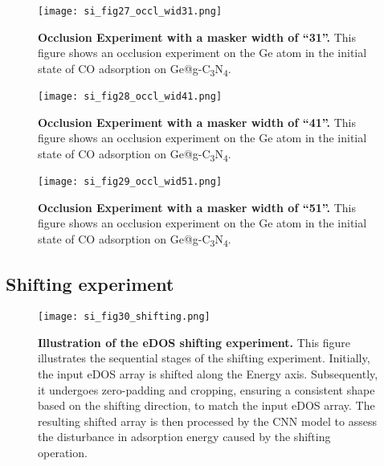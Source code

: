 \begin{figure}[htbp]
  \centering
  \texttt{[image: si\_fig27\_occl\_wid31.png]}
  \caption{\textbf{Occlusion Experiment with a masker width of “31”.}
  This figure shows an occlusion experiment on the Ge atom in
  the initial state of CO adsorption on Ge@g-C\textsubscript{3}N\textsubscript{4}.}
  \label{si_fig27:occl_wid31}
\end{figure}

\begin{figure}[htbp]
  \centering
  \texttt{[image: si\_fig28\_occl\_wid41.png]}
  \caption{\textbf{Occlusion Experiment with a masker width of “41”.}
  This figure shows an occlusion experiment on the Ge atom in
  the initial state of CO adsorption on Ge@g-C\textsubscript{3}N\textsubscript{4}.}
  \label{si_fig28:occl_wid41}
\end{figure}

\begin{figure}[htbp]
  \centering
  \texttt{[image: si\_fig29\_occl\_wid51.png]}
  \caption{\textbf{Occlusion Experiment with a masker width of “51”.}
  This figure shows an occlusion experiment on the Ge atom in
  the initial state of CO adsorption on Ge@g-C\textsubscript{3}N\textsubscript{4}.}
  \label{si_fig29:occl_wid51}
\end{figure}

\subsection{Shifting experiment}
\label{si_sec3.6_shifting}

\begin{figure}[htbp]
  \centering
  \texttt{[image: si\_fig30\_shifting.png]}
  \caption{\textbf{Illustration of the eDOS shifting experiment.}
  This figure illustrates the sequential stages of the shifting experiment.
  Initially, the input eDOS array is shifted along the Energy axis.
  Subsequently, it undergoes zero-padding and cropping,
  ensuring a consistent shape based on the shifting direction, to match the input eDOS array.
  The resulting shifted array is then processed by the CNN model to
  assess the disturbance in adsorption energy caused by the shifting operation.}
  \label{si_fig30:shifting}
\end{figure}

